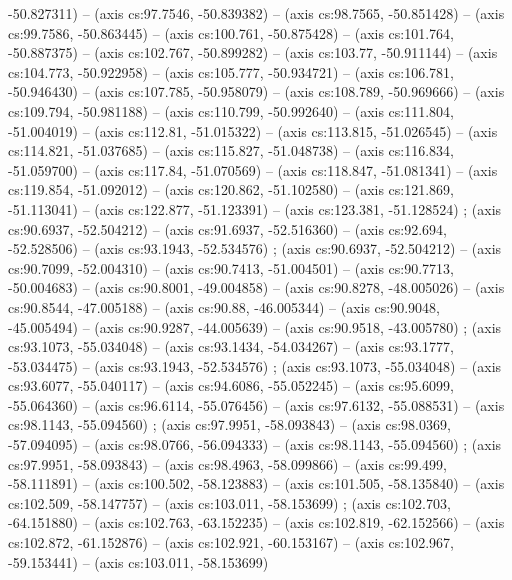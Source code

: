   -50.827311) -- (axis cs:97.7546, -50.839382) -- (axis cs:98.7565,
  -50.851428) -- (axis cs:99.7586, -50.863445) -- (axis cs:100.761,
  -50.875428) -- (axis cs:101.764, -50.887375) -- (axis cs:102.767,
  -50.899282) -- (axis cs:103.77, -50.911144) -- (axis cs:104.773, -50.922958)
  -- (axis cs:105.777, -50.934721) -- (axis cs:106.781, -50.946430) -- (axis
  cs:107.785, -50.958079) -- (axis cs:108.789, -50.969666) -- (axis
  cs:109.794, -50.981188) -- (axis cs:110.799, -50.992640) -- (axis
  cs:111.804, -51.004019) -- (axis cs:112.81, -51.015322) -- (axis cs:113.815,
  -51.026545) -- (axis cs:114.821, -51.037685) -- (axis cs:115.827,
  -51.048738) -- (axis cs:116.834, -51.059700) -- (axis cs:117.84, -51.070569)
  -- (axis cs:118.847, -51.081341) -- (axis cs:119.854, -51.092012) -- (axis
  cs:120.862, -51.102580) -- (axis cs:121.869, -51.113041) -- (axis
  cs:122.877, -51.123391) -- (axis cs:123.381, -51.128524)
  ;  (axis cs:90.6937, -52.504212) -- (axis
  cs:91.6937, -52.516360) -- (axis cs:92.694, -52.528506) -- (axis cs:93.1943,
  -52.534576) ;  (axis cs:90.6937, -52.504212) --
  (axis cs:90.7099, -52.004310) -- (axis cs:90.7413, -51.004501) -- (axis
  cs:90.7713, -50.004683) -- (axis cs:90.8001, -49.004858) -- (axis
  cs:90.8278, -48.005026) -- (axis cs:90.8544, -47.005188) -- (axis cs:90.88,
  -46.005344) -- (axis cs:90.9048, -45.005494) -- (axis cs:90.9287,
  -44.005639) -- (axis cs:90.9518, -43.005780) ; 
  (axis cs:93.1073, -55.034048) -- (axis cs:93.1434, -54.034267) -- (axis
  cs:93.1777, -53.034475) -- (axis cs:93.1943, -52.534576)
  ;  (axis cs:93.1073, -55.034048) -- (axis
  cs:93.6077, -55.040117) -- (axis cs:94.6086, -55.052245) -- (axis
  cs:95.6099, -55.064360) -- (axis cs:96.6114, -55.076456) -- (axis
  cs:97.6132, -55.088531) -- (axis cs:98.1143, -55.094560)
  ;  (axis cs:97.9951, -58.093843) -- (axis
  cs:98.0369, -57.094095) -- (axis cs:98.0766, -56.094333) -- (axis
  cs:98.1143, -55.094560) ;  (axis cs:97.9951,
  -58.093843) -- (axis cs:98.4963, -58.099866) -- (axis cs:99.499, -58.111891)
  -- (axis cs:100.502, -58.123883) -- (axis cs:101.505, -58.135840) -- (axis
  cs:102.509, -58.147757) -- (axis cs:103.011, -58.153699)
  ;  (axis cs:102.703, -64.151880) -- (axis
  cs:102.763, -63.152235) -- (axis cs:102.819, -62.152566) -- (axis
  cs:102.872, -61.152876) -- (axis cs:102.921, -60.153167) -- (axis
  cs:102.967, -59.153441) -- (axis cs:103.011, -58.153699)
